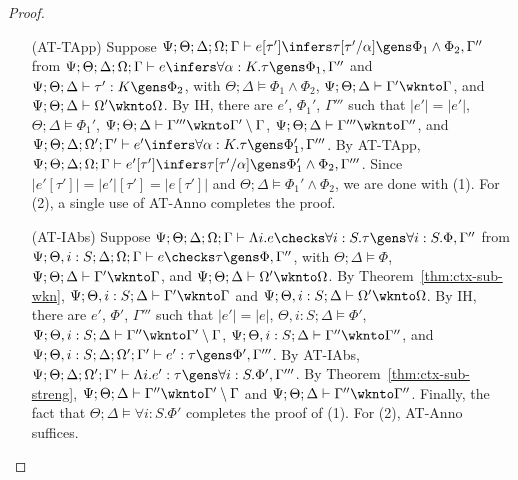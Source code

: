 \begin{proof}
\begin{itemize}
  \item[(AT-TApp)] Suppose $\Psi ; \Theta ; \Delta ; \Omega ; \Gamma \vdash e [\tau'] \infers \tau[\tau'/\alpha] \gens \Phi_1 \wedge \Phi_2, \Gamma''$ from
  $\Psi ; \Theta ; \Delta ; \Omega ; \Gamma \vdash e \infers \forall \alpha : K.\tau \gens \Phi_1, \Gamma''$ and
  $\Psi ; \Theta ; \Delta \vdash \tau' : K \gens \Phi_2$, with
  $\Theta ; \Delta \vDash \Phi_1 \wedge \Phi_2$,
  $\Psi ; \Theta ; \Delta \vdash \Gamma' \wknto \Gamma$, and
  $\Psi ; \Theta ; \Delta \vdash \Omega' \wknto \Omega$.
  By IH, there are $e'$, $\Phi_1'$, $\Gamma'''$ such that 
  $|e'| = |e'|$,
  $\Theta ; \Delta \vDash \Phi_1'$,
  $\Psi ; \Theta ; \Delta \vdash \Gamma''' \wknto \Gamma' \setminus \Gamma$,
  $\Psi ; \Theta ; \Delta \vdash \Gamma''' \wknto \Gamma''$, and
  $\Psi ; \Theta ; \Delta ; \Omega' ; \Gamma' \vdash e' \infers \forall \alpha : K.\tau \gens \Phi_1', \Gamma'''$.
  By AT-TApp,
  $\Psi ; \Theta ; \Delta ; \Omega ; \Gamma \vdash e' [\tau'] \infers \tau[\tau'/\alpha] \gens \Phi_1' \wedge \Phi_2, \Gamma'''$.
  Since $|e' [\tau']| = |e'| [\tau'] = |e [\tau']|$ and $\Theta ; \Delta \vDash \Phi_1' \wedge \Phi_2$, we are done with (1).
  For (2), a single use of AT-Anno completes the proof.
  
  \item[(AT-IAbs)] Suppose $\Psi ; \Theta ; \Delta ; \Omega ; \Gamma \vdash \Lambda i. e \checks \forall i : S. \tau \gens \forall i : S. \Phi, \Gamma''$
  from $\Psi ; \Theta, i : S ; \Delta ; \Omega ; \Gamma \vdash e \checks \tau \gens \Phi, \Gamma''$, with
  $\Theta ; \Delta \vDash \Phi$,
  $\Psi ; \Theta ; \Delta \vdash \Gamma' \wknto \Gamma$, and
  $\Psi ; \Theta ; \Delta \vdash \Omega' \wknto \Omega$.
  By Theorem~\ref{thm:ctx-sub-wkn},
  $\Psi ; \Theta, i : S ; \Delta \vdash \Gamma' \wknto \Gamma$ and
  $\Psi ; \Theta, i : S ; \Delta \vdash \Omega' \wknto \Omega$.
  By IH, there are $e'$, $\Phi'$, $\Gamma'''$ such that
  $|e'| = |e|$,
  $\Theta, i : S; \Delta \vDash \Phi'$,
  $\Psi ; \Theta, i : S ; \Delta \vdash \Gamma'' \wknto \Gamma' \setminus \Gamma$,
  $\Psi ; \Theta, i : S ; \Delta \vdash \Gamma'' \wknto \Gamma''$, and
  $\Psi ; \Theta, i : S ; \Delta ; \Omega' ; \Gamma' \vdash e' : \tau \gens \Phi', \Gamma'''$.
  By AT-IAbs,
  $\Psi ; \Theta ; \Delta ; \Omega' ; \Gamma' \vdash \Lambda i. e' : \tau \gens \forall i : S. \Phi', \Gamma'''$.
  By Theorem~\ref{thm:ctx-sub-streng},
  $\Psi ; \Theta ; \Delta \vdash \Gamma'' \wknto \Gamma' \setminus \Gamma$ and
  $\Psi ; \Theta ; \Delta \vdash \Gamma'' \wknto \Gamma''$.
  Finally, the fact that $\Theta ; \Delta \vDash \forall i : S. \Phi'$
  completes the proof of (1).
  For (2), AT-Anno suffices.
  

\end{itemize}
\end{proof}
